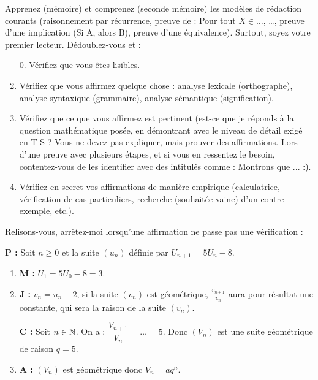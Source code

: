 \documentclass[a4paper,10pt,DIV18,BCOR0mm]{scrartcl}
\begin{document}
\newcommand{\auteur}[2]{\textbf{#1 : }\og #2\fg}
{\small
Apprenez (mémoire) et comprenez (seconde mémoire) les modèles de rédaction courants (raisonnement par récurrence, preuve de : \og Pour tout $X\in\dots$, \dots\fg, preuve d'une implication (Si A, alors B), preuve d'une équivalence). Surtout,
soyez votre premier lecteur. Dédoublez-vous et : 
\begin{enumerate}
 \item[0.] Vérifiez que vous êtes lisibles.
 \item Vérifiez que vous affirmez quelque chose : analyse lexicale (orthographe), analyse syntaxique (grammaire), analyse sémantique (signification).
 \item Vérifiez que ce que vous affirmez est pertinent (est-ce que je réponds à la question mathématique posée, en démontrant avec le niveau de détail exigé
en T S ? Vous ne devez pas expliquer, mais prouver des affirmations. Lors d'une preuve avec plusieurs étapes, et si vous en ressentez le besoin,
 contentez-vous de les identifier avec des intitulés comme : Montrons que ... :).
 \item Vérifiez en secret vos affirmations de manière empirique (calculatrice, vérification de cas particuliers, 
recherche (souhaitée vaine) d'un contre exemple, etc.).
\end{enumerate}
Relisons-vous, arrêtez-moi lorsqu'une affirmation ne passe pas une vérification :
}
\begin{exercice}
\auteur{P}{Soit $n\geq0$ et la suite $(u_n)$ définie par $U_{n+1}=5U_n-8$.}
\begin{enumerate}
 \item \auteur{M}{$U_1=5U_0-8=3$.}
 \item \auteur{J}{$v_n=u_n-2$, si la suite $(v_n)$ est géométrique, $\displaystyle\frac{v_{n+1}}{v_n}$ aura pour résultat une constante,
qui sera la raison de la suite $(v_n)$.} 

      \auteur{C}{Soit $n\in\mathbb{N}$. On a : $\dfrac{V_{n+1}}{V_n}=\dots=5$. Donc $(V_n)$ est une suite géométrique de raison $q=5$.}


      
 \item \auteur{A}{$(V_n)$ est géométrique donc $V_n=aq^n$.}
\end{enumerate}
\end{exercice}
\end{document}
